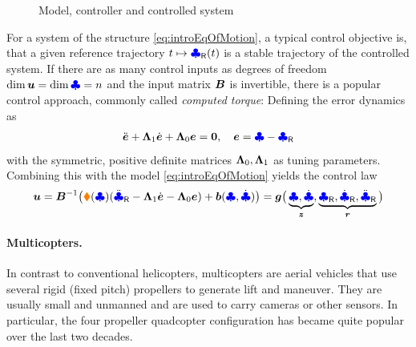 \begin{figure}[ht]
 \centering
 \newcommand{\macCtrlBlockKinetics}{$\dot{\sysState} = \tuple{f}(\sysState,\sysInput)$}
 \newcommand{\macCtrlBlockCtrl}{$\sysInput = \tuple{g}(\sysState, \tuple{r})$}
 \newcommand{\macControlBlockClosedLoopKinetics}{$\dot{\sysState} = \bar{\tuple{f}}(\sysState,\tuple{r})$}
 \newcommand{\macCtrlBlockMeas}{$\sysState$}
 \newcommand{\macCtrlBlockInput}{$\sysInput$}
 \newcommand{\macCtrlBlockRef}{$\tuple{r}$}
 \newcommand{\macCtrlBlockInitials}{$\sysState(t_0)$}
 
 \caption{Model, controller and controlled system}
 \label{fig:introCtrlBlock}
\end{figure}

For a system of the structure \eqref{eq:introEqOfMotion}, a typical control objective is, that a given reference trajectory $t \mapsto \boldsymbol{\textcolor{blue}{\clubsuit}}_{\mathsf{R}}(t)$ is a stable trajectory of the controlled system.
If there are as many control inputs as degrees of freedom $\dim\boldsymbol{u} = \dim\boldsymbol{\textcolor{blue}{\clubsuit}} = n$ and the input matrix $\boldsymbol{B}$ is invertible, there is a popular control approach, commonly called \textit{computed torque}:
Defining the error dynamics as
\begin{align}
 \ddot{\boldsymbol{e}} + \boldsymbol{\Lambda}_1 \dot{\boldsymbol{e}} + \boldsymbol{\Lambda}_0 \boldsymbol{e} = \boldsymbol{0}, \quad \boldsymbol{e} = \boldsymbol{\textcolor{blue}{\clubsuit}} - \boldsymbol{\textcolor{blue}{\clubsuit}}_{\mathsf{R}}
\end{align}
with the symmetric, positive definite matrices $\boldsymbol{\Lambda}_0, \boldsymbol{\Lambda}_1$ as tuning parameters.
Combining this with the model \eqref{eq:introEqOfMotion} yields the control law
\begin{align}
 \boldsymbol{u} = \boldsymbol{B}^{-1} \big( \boldsymbol{\textcolor{orange}{\blacklozenge}}(\boldsymbol{\textcolor{blue}{\clubsuit}})(\ddot{\boldsymbol{\textcolor{blue}{\clubsuit}}}_{\mathsf{R}} - \boldsymbol{\Lambda}_1 \dot{\boldsymbol{e}} - \boldsymbol{\Lambda}_0 \boldsymbol{e}) + \boldsymbol{b}(\boldsymbol{\textcolor{blue}{\clubsuit}},\dot{\boldsymbol{\textcolor{blue}{\clubsuit}}}) \big)
 = \boldsymbol{g}\big( \underbrace{\boldsymbol{\textcolor{blue}{\clubsuit}}, \dot{\boldsymbol{\textcolor{blue}{\clubsuit}}}}_{\boldsymbol{z}}, \underbrace{\boldsymbol{\textcolor{blue}{\clubsuit}}_{\mathsf{R}}, \dot{\boldsymbol{\textcolor{blue}{\clubsuit}}}_{\mathsf{R}}, \ddot{\boldsymbol{\textcolor{blue}{\clubsuit}}}_{\mathsf{R}}}_{\boldsymbol{r}} \big)
\end{align}

\paragraph{Multicopters.}
In contrast to conventional helicopters, multicopters are aerial vehicles that use several rigid (fixed pitch) propellers to generate lift and maneuver.
They are usually small and unmanned and are used to carry cameras or other sensors.
In particular, the four propeller quadcopter configuration has became quite popular over the last two decades.

